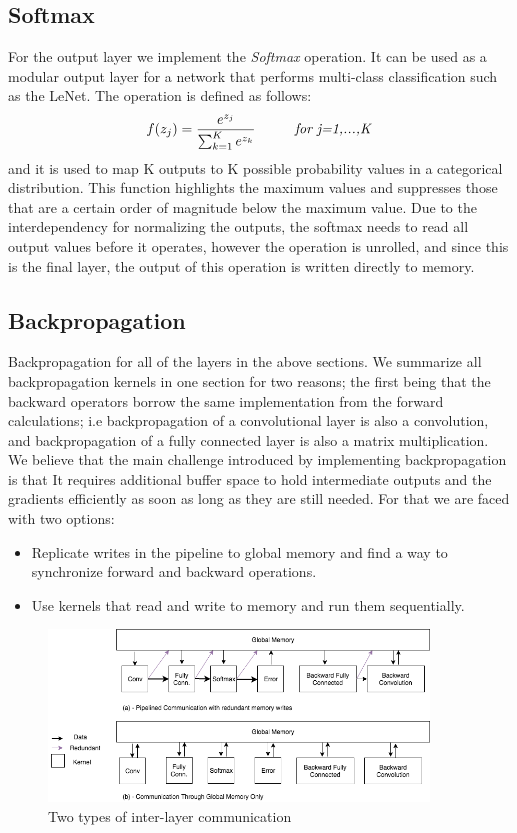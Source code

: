 \subsection{Softmax}

For the output layer we implement the \emph{Softmax} operation. It can be used as a modular output layer for a network that performs multi-class classification such as the LeNet. The operation is defined as follows: 
\begin{equation}
	f(z_j) = \frac{e^{z_j}}{\sum_{k=1}^{K} e^{z_k} } \hspace{1cm}  \mbox{\emph{for j=1,...,K}}
\end{equation}
and it is used to map K outputs to K possible probability values in a categorical distribution. This function highlights the maximum values and suppresses those that are a certain order of magnitude below the maximum value.  Due to the interdependency for normalizing the outputs, the softmax needs to read all output values before it operates, however the operation is unrolled, and since this is the final layer, the output of this operation is written directly to memory.

\subsection{Backpropagation}

Backpropagation for all of the layers in the above sections. We summarize all backpropagation kernels in one section for two reasons; the first being that the backward operators borrow the same implementation from the forward calculations; i.e backpropagation of a convolutional layer is also a convolution, and backpropagation of a fully connected layer is also a matrix multiplication. We believe that the main challenge introduced by implementing backpropagation is that It requires additional buffer space to hold intermediate outputs and the gradients efficiently as soon as long as they are still needed. For that we are faced with two options:
\begin{itemize}
\item
Replicate writes in the pipeline to global memory and find a way to synchronize forward and backward operations.
\item
Use kernels that read and write to memory and run them sequentially.
\end{itemize}

\begin{figure}[h]
\centering
\includegraphics[width=0.9\textwidth]{Figures/comm}
\caption[Types of inter-layer communication]{ Two types of inter-layer communication }
\label{fig:comm}
\end{figure}

